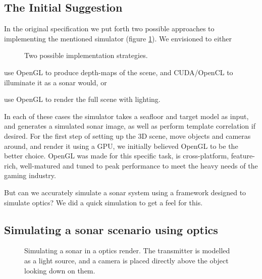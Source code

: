 \documentclass[
   article                                      %
 , 12pt                                         %
 , xelatex                                      %
 , bibtex                                       %
 , layout
]{common/mytemplate}
\begin{document}
\subsection{The Initial Suggestion}

In the original specification we put forth two possible approaches to implementing the mentioned simulator (figure \ref{implementation}). We envisioned to either

\begin{figure}[b]
\begin{narrow}{-2.3cm}{-2.3cm}
\end{narrow}
\caption{Two possible implementation strategies.}\label{implementation}
\end{figure}

\begin{itemize0}
\item use OpenGL to produce depth-maps of the scene, and CUDA/OpenCL to illuminate it as a sonar would, or
\item use OpenGL to render the full scene with lighting.
\end{itemize0}

In each of these cases the simulator takes a seafloor and target model as input, and generates a simulated sonar image, as well as perform template correlation if desired. For the first step of setting up the 3D scene, move objects and cameras around, and render it using a GPU, we initially believed OpenGL to be the better choice. OpenGL was made for this specific task, is cross-platform, feature-rich, well-matured and tuned to peak performance to meet the heavy needs of the gaming industry.

But can we accurately simulate a sonar system using a framework designed to simulate optics? We did a quick simulation to get a feel for this.


\subsection{Simulating a sonar scenario using optics}

\begin{figure}[b]
\begin{narrow}{-2.3cm}{-2.3cm}
\end{narrow}
\caption{Simulating a sonar in a optics render. The transmitter is modelled as a light source, and a camera is placed directly above the object looking down on them.}\label{simulation_setup}
\end{figure}
\end{document}

